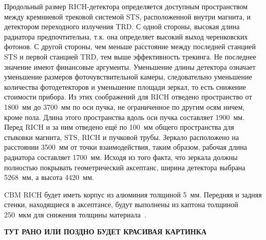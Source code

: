 Продольный размер RICH-детектора определяется доступным пространством между кремниевой трековой системой STS, расположенной внутри магнита, и детектором переходного излучения TRD. С одной стороны, высокая длина радиатора предпочтительна, т.к. она определяет высокий выход черенковских фотонов. С другой стороны, чем меньше расстояние между последней станцией STS и первой станцией TRD, тем выше эффективность трекинга. Не последнее значение имеют финансовые аргументы. Уменьшение длины детектора означает уменьшение размеров фоточувствительной камеры, следовательно уменьшение количества фотодетекторов и уменьшение площади зеркал, то есть снижение стоимости прибора.
Из этих соображений для RICH отведено пространство от 1800~мм до 3700~мм по оси пучка, не ограниченное по другим осям ничем, кроме пола. Длина этого пространства вдоль оси пучка составляет 1900~мм. Перед RICH и за ним отведено ещё по 100~мм общего пространства для стыковки магнита, STS, RICH и пучковой трубы. Зеркало расположено на расстоянии 3500~мм от точки взаимодействия, таким образом, рабочая длина радиатора составляет 1700~мм. Исходя из того факта, что зеркала должны полностью покрывать геометрический аксептанс, ширина детектора выбрана 5268~мм, а высота 4420~мм.

CBM RICH будет иметь корпус из алюминия толщиной 5~мм. Передняя и задняя стенки, находящиеся в аксептансе, будут выполнены из каптона толщиной 250~мкм для снижения толщины материала~\cite{TDR_RICH}.



\textbf{ТУТ РАНО ИЛИ ПОЗДНО БУДЕТ КРАСИВАЯ КАРТИНКА}

